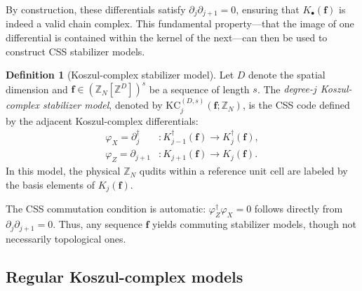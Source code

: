 \documentclass[aps,prx,english,superscriptaddress,twocolumn,tightenlines,showpacs,longbibliography,floatfix,amsfonts]{revtex4-2}
\theoremstyle{remark}
\theoremstyle{definition}
\newtheorem{definition}{Definition}
\begin{document}
By construction, these differentials satisfy $\partial_j  \partial_{j+1} = 0$, ensuring that $K_\bullet(\mathbf{f})$ is indeed a valid chain complex. This fundamental property---that the image of one differential is contained within the kernel of the next---can then be used to construct CSS stabilizer models.

\begin{definition}[Koszul-complex stabilizer model]
	\label{def:koszul-complex-model}
	Let $D$ denote the spatial dimension and $\mathbf{f} \in (\mathbb{Z}_N[\mathbb{Z}^D])^s$ be a sequence of length $s$. The \emph{degree-$j$ Koszul-complex stabilizer model}, denoted by $\mathrm{KC}_j^{(D,s)}(\mathbf{f}; \mathbb{Z}_N)$, is the CSS code defined by the adjacent Koszul-complex differentials:
	\begin{equation}
		\begin{aligned}
			\varphi_X = \partial_j^\dagger &\colon K_{j-1}^\dagger(\mathbf{f}) \to K_j^\dagger(\mathbf{f}), \\
			\varphi_Z = \partial_{j+1} &\colon K_{j+1}(\mathbf{f}) \to K_j(\mathbf{f}).
		\end{aligned}
		\label{eq:general-koszul-stabilizer-maps}
	\end{equation}
	In this model, the physical $\mathbb{Z}_N$ qudits within a reference unit cell are labeled by the basis elements of $K_j(\mathbf{f})$.
\end{definition}

The CSS commutation condition is automatic: $\varphi_Z^\dagger \varphi_X = 0$ follows directly from $\partial_j \partial_{j+1} = 0$. Thus, any sequence $\mathbf{f}$ yields commuting stabilizer models, though not necessarily topological ones.

\subsection{Regular Koszul-complex models}
\label{sec:regular-koszul-complex-models}
\end{document}
